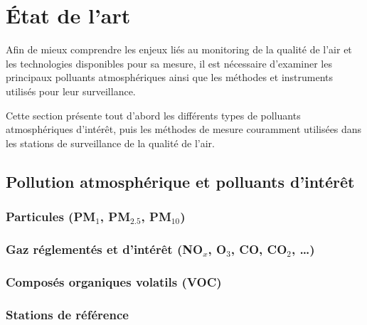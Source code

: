 \chapter{État de l'art}

Afin de mieux comprendre les enjeux liés au monitoring de la qualité de l'air et les technologies disponibles pour sa mesure, il est nécessaire d'examiner les principaux polluants atmosphériques ainsi que les méthodes et instruments utilisés pour leur surveillance.

Cette section présente tout d'abord les différents types de polluants atmosphériques d'intérêt, puis les méthodes de mesure couramment utilisées dans les stations de surveillance de la qualité de l'air.
\section{Pollution atmosphérique et polluants d'intérêt}
\subsection{Particules (PM$_{1}$, PM$_{2.5}$, PM$_{10}$)}


\subsection{Gaz réglementés et d'intérêt (NO$_x$, O$_3$, CO, CO$_2$, \dots)}
\subsection{Composés organiques volatils (VOC)}

\subsection{Stations de référence}
